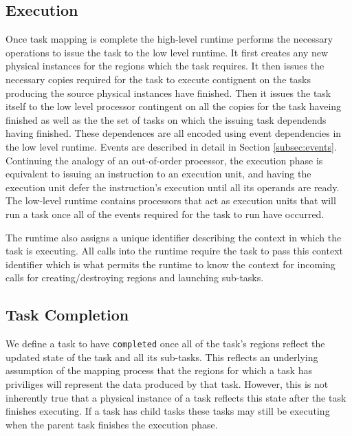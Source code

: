 \subsection{Execution}
\label{subsec:execution}
Once task mapping is complete the high-level runtime performs the necessary operations
to issue the task to the low level runtime.  It first creates any new physical instances
for the regions which the task requires.  It then issues the necessary copies required
for the task to execute contignent on the tasks producing the source physical instances
have finished.  Then it issues the task itself to the low level processor contingent
on all the copies for the task haveing finished as well as the the set of tasks
on which the issuing task dependends having finished.  These dependences are all encoded
using event dependencies in the low level runtime.  Events are described
in detail in Section \ref{subsec:events}.  Continuing the analogy of an out-of-order
processor, the execution phase is equivalent to issuing an instruction to an
execution unit, and having the execution unit defer the instruction's execution until all its
operands are ready.  The low-level runtime contains processors that act as execution
units that will run a task once all of the events required for the task to run
have occurred. 


The runtime also assigns a unique identifier describing the context
in which the task is executing.  All calls into the runtime require the task
to pass this context identifier which is what permits the runtime to know the context
for incoming calls for creating/destroying regions and launching sub-tasks.  

\subsection{Task Completion}
\label{subsec:cleanup}
We define a task to have {\tt completed} once all of the task's regions reflect
the updated state of the task and all its sub-tasks.  This reflects an underlying assumption 
of the mapping process that the regions for which a task has priviliges will represent the data produced 
by that task.  However, this is not inherently true that a physical instance of a task reflects
this state after the task finishes executing.  If a task has child tasks these tasks may
still be executing when the parent task finishes the execution phase.  

